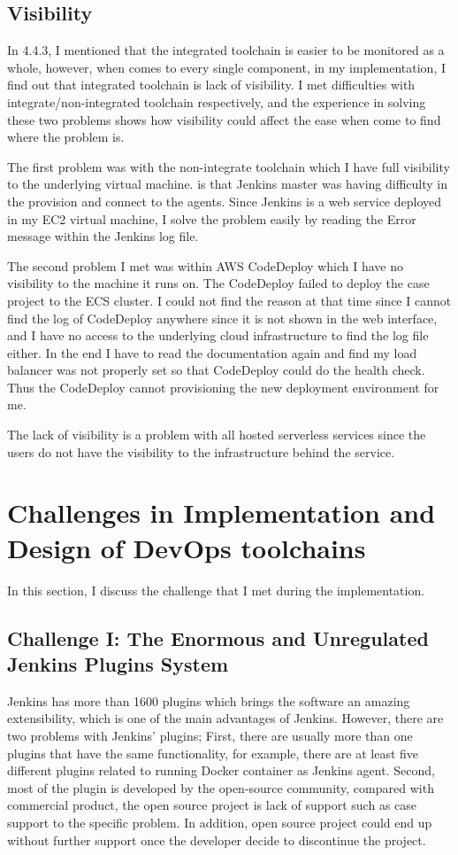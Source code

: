 \subsection{Visibility}
\label{visibility}
In 4.4.3, I mentioned that the integrated toolchain is easier to be monitored as a whole, however, when comes to every single component, in my implementation, I find out that integrated toolchain is lack of visibility. I met difficulties with integrate/non-integrated toolchain respectively, and the experience in solving these two problems shows how visibility could affect the ease when come to find where the problem is.
\par
The first problem was with the non-integrate toolchain which I have full visibility to the underlying virtual machine. is that Jenkins master was having difficulty in the provision and connect to the agents. Since Jenkins is a web service deployed in my EC2 virtual machine, I solve the problem easily by reading the Error message within the Jenkins log file.
\par
The second problem I met was within AWS CodeDeploy which I have no visibility to the machine it runs on. The CodeDeploy failed to deploy the case project to the ECS cluster. I could not find the reason at that time since I cannot find the log of CodeDeploy anywhere since it is not shown in the web interface, and I have no access to the underlying cloud infrastructure to find the log file either. In the end I have to read the documentation again and find my load balancer was not properly set so that CodeDeploy could do the health check. Thus the CodeDeploy cannot provisioning the new deployment environment for me.
\par
The lack of visibility is a problem with all hosted serverless services since the users do not have the visibility to the infrastructure behind the service.
\section{Challenges in Implementation and Design of DevOps toolchains}
In this section, I discuss the challenge that I met during the implementation. 
\subsection{Challenge I: The Enormous and Unregulated Jenkins Plugins System}
Jenkins has more than 1600 plugins which brings the software an amazing extensibility, which is one of the main advantages of Jenkins. However, there are two problems with Jenkins' plugins; First, there are usually more than one plugins that have the same functionality, for example, there are at least five different plugins related to running Docker container as Jenkins agent. Second, most of the plugin is developed by the open-source community, compared with commercial product, the open source project is lack of support such as case support to the specific problem. In addition, open source project could end up without further support once the developer decide to discontinue the project.

